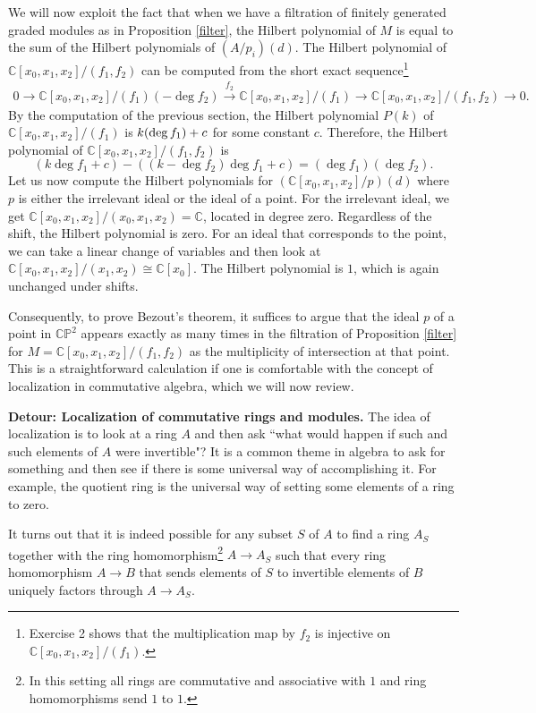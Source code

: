 \documentclass[11pt]{article}
\numberwithin{equation}{section}
\numberwithin{footnote}{section}
\newcommand{\blue}{\color{blue}}
\renewcommand{\P}{{\mathbb P}}
\newcommand{\C}{{\mathbb C}}
\begin{document}
We will now exploit the fact that when we have a filtration of finitely generated graded modules as in Proposition \ref{filter}, the Hilbert polynomial of $M$ is equal to the sum of the Hilbert polynomials of $(A/p_i)(d)$. The Hilbert polynomial of $\C[x_0,x_1,x_2]/(f_1,f_2)$ can be computed from the short exact sequence\footnote{ Exercise 2 shows that the multiplication map by $f_2$ is injective on $\C[x_0,x_1,x_2]/(f_1).$}
\begin{align*}
0\to\C[x_0,x_1,x_2]/(f_1) (-\deg f_2) \stackrel {f_2}\longrightarrow \C[x_0,x_1,x_2]/(f_1) 
\to \C[x_0,x_1,x_2]/(f_1,f_2)\to 0.
\end{align*}
By the computation of the previous section, the Hilbert polynomial $P(k)$ of $\C[x_0,x_1,x_2]/(f_1)$  is $k(\deg f_1) + {\rm c}$ for some constant $c$. Therefore, the Hilbert polynomial of $\C[x_0,x_1,x_2]/(f_1,f_2)$ is 
$$
(k \deg f_1 + c ) - ((k-\deg f_2) \deg f_1 + c ) = (\deg f_1)(\deg f_2).
$$
Let us now compute the Hilbert polynomials for $(\C[x_0,x_1,x_2]/p)(d)$ where $p$ is either the irrelevant ideal or the ideal of a point. For the irrelevant ideal, we get $\C[x_0,x_1,x_2]/(x_0,x_1,x_2)=\C$, located in degree zero. Regardless of the shift, the Hilbert polynomial is zero. For an ideal that corresponds to the point, we can take a linear change of variables and then look at $\C[x_0,x_1,x_2]/(x_1,x_2) \cong \C[x_0]$. The Hilbert polynomial is $1$, which is again unchanged under shifts.

\smallskip
Consequently, to prove Bezout's theorem, it suffices to argue that the ideal $p$ of a point in $\C\P^2$ appears exactly as many times in the filtration of Proposition \ref{filter} for $M = \C[x_0,x_1,x_2]/(f_1,f_2)$ as the multiplicity of intersection at that point. This is a straightforward calculation if one is comfortable with the concept of localization in commutative algebra, which we will now review. 

\smallskip{\blue \hrule}
{\bf Detour: Localization of commutative rings and modules.}
The idea of localization is to look at a ring $A$ and then ask ``what would happen if such and such elements of $A$ were invertible"? It is a common theme in algebra to ask for something and then see if there is some universal way of accomplishing it. For example, the quotient ring is the universal way of setting some elements of a ring to zero. 

It turns out that it is indeed possible for any subset $S$ of $A$ to find a ring $A_S$ together with the ring homomorphism\footnote{ In this setting all rings are commutative and associative with $1$ and ring homomorphisms send $1$ to $1$.}  $A\to A_S$ such that every ring homomorphism $A\to B$ that sends elements of $S$ to invertible elements of $B$ uniquely factors through $A\to A_S$.
\end{document}
